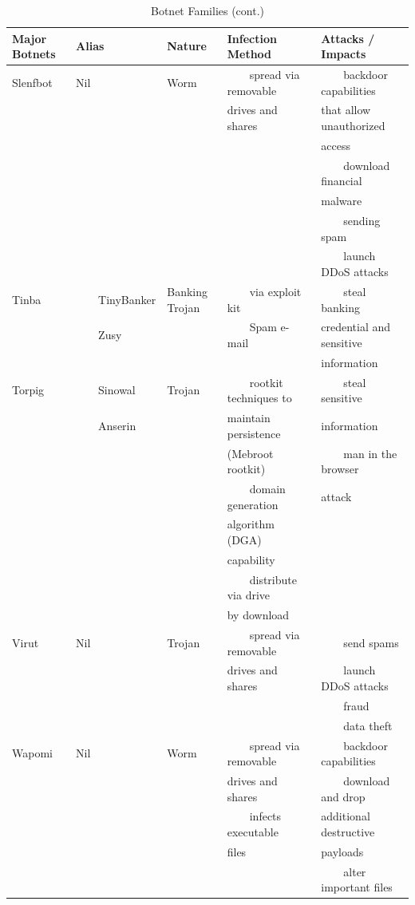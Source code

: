 \documentclass[12pt]{article}
\newcommand{\tabitem}{~~\llap{\textbullet}~~}
\begin{document}
\newpage\begin{table}[!htbp]
\centering
\caption{Botnet Families (cont.)}
\begin{tabular}{lllll} \hline
\bf Major Botnets & \bf Alias & \bf Nature & \bf Infection Method & \bf Attacks / Impacts\\\hline
Slenfbot &Nil    &Worm    &\tabitem spread via removable &\tabitem backdoor capabilities \\
&&&drives and shares    &that allow unauthorized \\
&&&&access \\
&&&&\tabitem download financial \\
&&&&malware \\
&&&&\tabitem sending spam \\
&&&&\tabitem launch DDoS attacks \\
Tinba &\tabitem TinyBanker &Banking Trojan &\tabitem via exploit kit &\tabitem steal banking \\
&\tabitem Zusy &&\tabitem Spam e-mail &credential and sensitive \\
&&&&information  \\
Torpig &\tabitem Sinowal &Trojan   &\tabitem rootkit techniques to &\tabitem steal sensitive \\
&\tabitem Anserin  &&maintain persistence &information \\
&&&(Mebroot rootkit) &\tabitem man in the browser \\
&&&\tabitem domain generation &attack  \\
&&&algorithm (DGA) &\\
&&&capability &\\
&&&\tabitem distribute via drive &\\
&&&by download &\\
Virut  &Nil    &Trojan    &\tabitem spread via removable &\tabitem send spams \\
&&&drives and shares    &\tabitem launch DDoS attacks \\
&&&&\tabitem fraud \\
&&&&\tabitem data theft \\
Wapomi &Nil    &Worm    &\tabitem spread via removable &\tabitem backdoor capabilities \\
&&&drives and shares &\tabitem download and drop \\
&&&\tabitem infects executable &additional destructive \\
&&&files   &payloads \\
&&&&\tabitem alter important files \\

\end{tabular}
\end{table}
\end{document}
